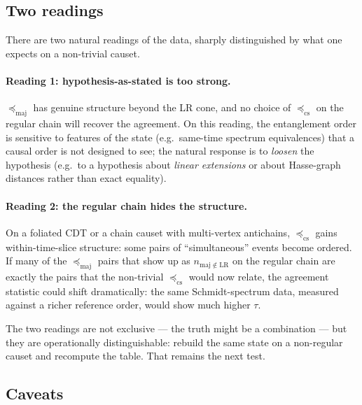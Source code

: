 \documentclass[11pt,a4paper]{article}
\theoremstyle{definition}
\theoremstyle{plain}
\theoremstyle{remark}
\newcommand{\maj}{\mathrm{maj}}
\newcommand{\LR}{\mathrm{LR}}
\newcommand{\cs}{\mathrm{cs}}
\begin{document}
\subsection{Two readings}

There are two natural readings of the data, sharply distinguished by
what one expects on a non-trivial causet.

\paragraph{Reading 1: hypothesis-as-stated is too strong.}
$\preceq_{\maj}$ has genuine structure beyond the LR cone, and no
choice of $\preceq_{\cs}$ on the regular chain will recover the
agreement.  On this reading, the entanglement order is sensitive to
features of the state (e.g.\ same-time spectrum equivalences) that
a causal order is not designed to see; the natural response is to
\emph{loosen} the hypothesis (e.g.\ to a hypothesis about
\emph{linear extensions} or about Hasse-graph distances rather than
exact equality).

\paragraph{Reading 2: the regular chain hides the structure.}
On a foliated CDT or a chain causet with multi-vertex antichains,
$\preceq_{\cs}$ gains within-time-slice structure: some pairs of
``simultaneous'' events become ordered.  If many of the
$\preceq_{\maj}$ pairs that show up as $n_{\maj \notin \LR}$ on the
regular chain are exactly the pairs that the non-trivial
$\preceq_{\cs}$ would now relate, the agreement statistic could
shift dramatically: the same Schmidt-spectrum data, measured against
a richer reference order, would show much higher $\tau$.

The two readings are not exclusive --- the truth might be a
combination --- but they are operationally distinguishable: rebuild
the same state on a non-regular causet and recompute the table.  That
remains the next test.

\subsection{Caveats}
\end{document}
